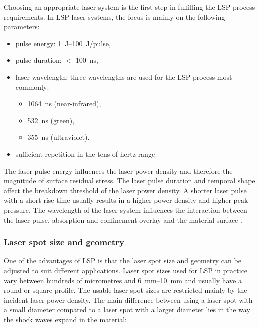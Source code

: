 Choosing an appropriate laser system is the first step in fulfilling the LSP process requirements. In LSP laser systems, the focus is mainly on the following parameters:
\begin{itemize}

    \item pulse energy: \SIrange{1}{100}{\joule}/pulse,
    \item pulse duration: $<$ \SI{100}{\nano\second},
    
    \item laser wavelength: three wavelengths are used for the LSP process most commonly:
    
    \begin{itemize}

        \item \SI{1064}{\nano\second} (near-infrared),
        \item \SI{532}{\nano\second} (green),
        \item \SI{355}{\nano\second} (ultraviolet).

    \end{itemize}
    
    \item sufficient repetition in the tens of hertz range

\end{itemize}

The laser pulse energy influences the laser power density and therefore the magnitude of surface residual stress. 
The laser pulse duration and temporal shape affect the breakdown threshold of the laser power density. A shorter laser pulse with a short rise time usually results in a higher power density and higher peak pressure. 
The wavelength of the laser system influences the interaction between the laser pulse, absorption and confinement overlay and the material surface \cite{fabbro_peyre_berthe_scherpereel_1998}. 

\subsubsection*{Laser spot size and geometry}

One of the advantages of LSP is that the laser spot size and geometry can be adjusted to suit different applications. Laser spot sizes used for LSP in practice vary between hundreds of micrometres and \SIrange{6}{10}{\mm} and usually have a round or square profile. The usable laser spot sizes are restricted mainly by the incident laser power density. The main difference between using a laser spot with a small diameter compared to a laser spot with a larger diameter lies in the way the shock waves expand in the material:

